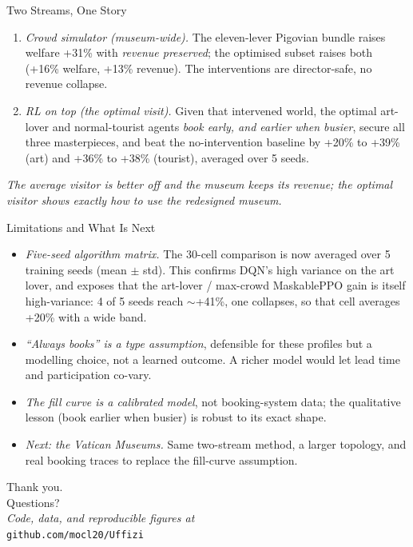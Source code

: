 \documentclass[aspectratio=169, 11pt]{beamer}
\newcommand{\good}[1]{\textcolor{safegreen}{#1}}
\newcommand{\warn}[1]{\textcolor{warnorange}{#1}}
\newcommand{\emp}[1]{\textit{#1}}
\newcommand{\code}[1]{\texttt{\small #1}}
\begin{document}
\begin{frame}{Two Streams, One Story}
\footnotesize
\begin{enumerate}\setlength\itemsep{4pt}
\item \emp{Crowd simulator (museum-wide).} The eleven-lever Pigovian bundle raises
      welfare \good{+31\%} with \emp{revenue preserved}; the optimised subset raises
      both (\good{+16\%} welfare, \good{+13\%} revenue). The interventions are
      director-safe, no revenue collapse.
\item \emp{RL on top (the optimal visit).} Given that intervened world, the optimal
      art-lover and normal-tourist agents \emp{book early, and earlier when busier},
      secure all three masterpieces, and beat the no-intervention baseline by
      \good{+20\% to +39\%} (art) and \good{+36\% to +38\%} (tourist), averaged over 5 seeds.
\end{enumerate}
\vspace{0.4em}
\begin{center}
\emp{The average visitor is better off and the museum keeps its revenue; the optimal
visitor shows exactly how to use the redesigned museum.}
\end{center}
\end{frame}

\begin{frame}{Limitations and What Is Next}
\footnotesize
\begin{itemize}\setlength\itemsep{3pt}
\item \emp{Five-seed algorithm matrix.} The 30-cell comparison is now averaged over 5
      training seeds (mean $\pm$ std). This confirms DQN's high variance on the art lover,
      and exposes that the art-lover / max-crowd MaskablePPO gain is itself high-variance:
      4 of 5 seeds reach $\sim$+41\%, one collapses, so that cell averages \warn{+20\%} with a wide band.
\item \emp{``Always books'' is a type assumption}, defensible for these profiles but a
      modelling choice, not a learned outcome. A richer model would let lead time and
      participation co-vary.
\item \emp{The fill curve is a calibrated model}, not booking-system data; the qualitative
      lesson (book earlier when busier) is robust to its exact shape.
\item \emp{Next: the Vatican Museums.} Same two-stream method, a larger topology, and
      real booking traces to replace the fill-curve assumption.
\end{itemize}
\end{frame}

\begin{frame}{}
\centering
\vspace*{1.5cm}
{\Huge Thank you.}\\[0.8em]
{\large Questions?}\\[1.5em]
\footnotesize
\emp{Code, data, and reproducible figures at}\\
\code{github.com/mocl20/Uffizi}
\end{frame}
\end{document}
